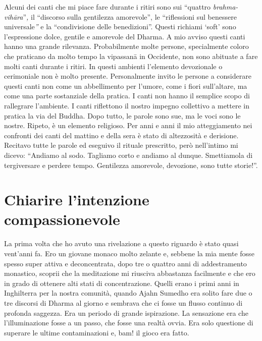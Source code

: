 Alcuni dei canti che mi piace fare durante i ritiri sono sui ``quattro \textit{brahma-vihāra}''\textit{, }il ``discorso sulla gentilezza amorevole'', le ``riflessioni sul benessere\textit{ }universale\textit{''} e la ``condivisione delle benedizioni''. Questi richiami `soft' sono l'espressione dolce, gentile e amorevole del Dharma. A mio avviso questi canti hanno una grande rilevanza. Probabilmente molte persone, specialmente coloro che praticano da molto tempo la vipassanā in Occidente, non sono abituate a fare molti canti durante i ritiri. In questi ambienti l'elemento devozionale o cerimoniale non è molto presente. Personalmente invito le persone a considerare questi canti non come un abbellimento per l'umore, come i fiori sull'altare, ma come una parte sostanziale della pratica. I canti non hanno il semplice scopo di rallegrare l'ambiente. I canti riflettono il nostro impegno collettivo a mettere in pratica la via del Buddha. Dopo tutto, le parole sono sue, ma le voci sono le nostre. Ripeto, è un elemento religioso. Per anni e anni il mio atteggiamento nei confronti dei canti del mattino e della sera è stato di altezzosità e derisione. Recitavo tutte le parole ed eseguivo il rituale prescritto, però nell'intimo mi dicevo: ``Andiamo al sodo. Tagliamo corto e andiamo al dunque. Smettiamola di tergiversare e perdere tempo. Gentilezza amorevole, devozione, sono tutte storie!''.

\section*{Chiarire l'intenzione compassionevole}

La prima volta che ho avuto una rivelazione a questo riguardo è stato quasi vent'anni fa. Ero un giovane monaco molto zelante e, sebbene la mia mente fosse spesso super attiva e deconcentrata, dopo tre o quattro anni di addestramento monastico, scoprii che la meditazione mi riusciva abbastanza facilmente e che ero in grado di ottenere alti stati di concentrazione. Quelli erano i primi anni in Inghilterra per la nostra comunità, quando Ajahn Sumedho era solito fare due o tre discorsi di Dharma al giorno e sembrava che ci fosse un flusso continuo di profonda saggezza. Era un periodo di grande ispirazione. La sensazione era che l'illuminazione fosse a un passo, che fosse una realtà ovvia. Era solo questione di superare le ultime contaminazioni e, bam! il gioco era fatto.


